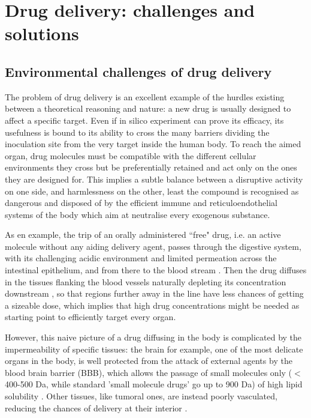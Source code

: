 \clearpage


\section{Drug delivery: challenges and solutions}

\subsection{Environmental challenges of drug delivery}
The problem of drug delivery is an excellent example of the hurdles existing between a theoretical reasoning and nature: a new drug is usually designed to affect a specific target. Even if in silico experiment can prove its efficacy, its usefulness is bound to its ability to cross the many barriers dividing the inoculation site from the very target inside the human body.
%
To reach the aimed organ, drug molecules must be compatible with the different cellular environments they cross but be preferentially retained and act only on the ones they are designed for. This implies a subtle balance between a disruptive activity on one side, and harmlessness on the other, least the compound is recognised as dangerous and disposed of by the efficient immune and reticuloendothelial systems of the body which aim at neutralise every exogenous substance.

As en example, the trip of an orally  administered ``free" drug, i.e. an active molecule without any aiding delivery agent, passes through the digestive system, with its challenging acidic environment and limited permeation across the intestinal epithelium, and from there to the blood stream \cite{Masaoka2006, Mitragotri2014}. Then the drug diffuses in the tissues flanking the blood vessels naturally depleting its concentration downstream \cite{Krol2012}, so that regions further away in the line have less chances of getting a sizeable dose, which implies that high drug concentrations might be needed as starting point to efficiently target every organ.

However, this naive picture of a drug diffusing in the body is complicated by the impermeability of specific tissues: the brain for example, one of the most delicate organs in the body, is well protected from the attack of external agents by the blood brain barrier (BBB), which allows the passage of small molecules only ($<$ 400-500 Da, while standard 'small molecule drugs' go up to 900 Da) of high lipid solubility \cite{Pattni2015, Krol2012}. Other tissues, like tumoral ones, are instead poorly vasculated, reducing the chances of delivery at their interior \cite{Pattni2015}.

